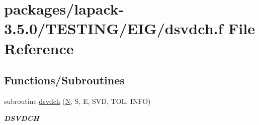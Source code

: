 \hypertarget{dsvdch_8f}{}\section{packages/lapack-\/3.5.0/\+T\+E\+S\+T\+I\+N\+G/\+E\+I\+G/dsvdch.f File Reference}
\label{dsvdch_8f}
\subsection*{Functions/\+Subroutines}
\begin{DoxyCompactItemize}
\item 
subroutine \hyperlink{group__double__eig_ga970e8ed2adc72fcf96d412fcb3d33226}{dsvdch} (\hyperlink{polmisc_8c_a0240ac851181b84ac374872dc5434ee4}{N}, S, E, S\+V\+D, T\+O\+L, I\+N\+F\+O)
\begin{DoxyCompactList}\small\item\em {\bfseries D\+S\+V\+D\+C\+H} \end{DoxyCompactList}\end{DoxyCompactItemize}
